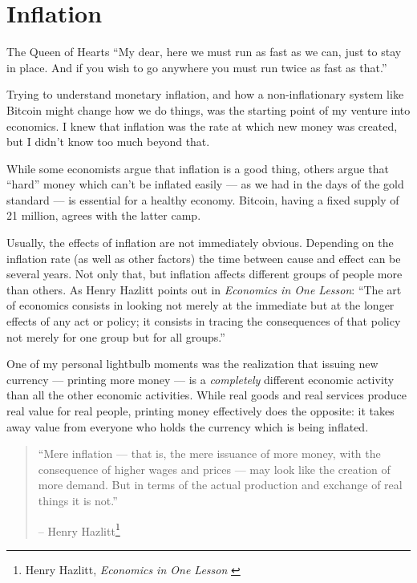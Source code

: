 \chapter{Inflation}
\label{les:9}

\begin{chapquote}{The Queen of Hearts} %
\enquote{My dear, here we must run as fast as we can, just to stay in place. And if you
wish to go anywhere you must run twice as fast as that.}
\end{chapquote}

Trying to understand monetary inflation, and how a non-inflationary
system like Bitcoin might change how we do things, was the starting
point of my venture into economics. I knew that inflation was the rate
at which new money was created, but I didn't know too much beyond that.

While some economists argue that inflation is a good thing, others argue
that \enquote{hard} money which can't be inflated easily --- as we had in the
days of the gold standard --- is essential for a healthy economy.
Bitcoin, having a fixed supply of 21 million, agrees with the latter
camp.

Usually, the effects of inflation are not immediately obvious. Depending
on the inflation rate (as well as other factors) the time between cause
and effect can be several years. Not only that, but inflation affects
different groups of people more than others. As Henry Hazlitt points out
in \textit{Economics in One Lesson}: \enquote{The art of economics consists in looking
not merely at the immediate but at the longer effects of any act or
policy; it consists in tracing the consequences of that policy not
merely for one group but for all groups.}

One of my personal lightbulb moments was the realization that issuing
new currency --- printing more money --- is a \textit{completely} different
economic activity than all the other economic activities. While real
goods and real services produce real value for real people, printing
money effectively does the opposite: it takes away value from everyone
who holds the currency which is being inflated.

\begin{quotation}\begin{samepage}
\enquote{Mere inflation --- that is, the mere issuance of more money, with the
consequence of higher wages and prices --- may look like the creation
of more demand. But in terms of the actual production and exchange of
real things it is not.}
\begin{flushright} -- Henry Hazlitt\footnote{Henry Hazlitt, \textit{Economics in One Lesson} \cite{hazlitt}}
\end{flushright}\end{samepage}\end{quotation}

